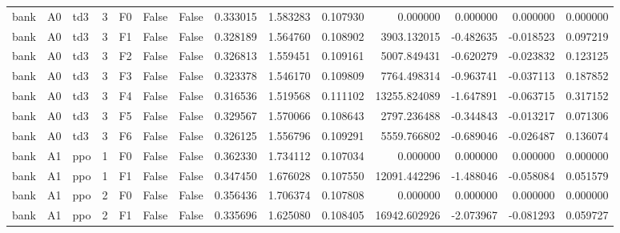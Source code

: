 \begin{tabular}{lllrlllrrrrrrr}
      bank &      A0 &       td3 &     3 &  F0 &           False &            False &  0.333015 &  1.583283 & 0.107930 &         0.000000 &           0.000000 &        0.000000 &            0.000000 \\
      bank &      A0 &       td3 &     3 &  F1 &           False &            False &  0.328189 &  1.564760 & 0.108902 &      3903.132015 &          -0.482635 &       -0.018523 &            0.097219 \\
      bank &      A0 &       td3 &     3 &  F2 &           False &            False &  0.326813 &  1.559451 & 0.109161 &      5007.849431 &          -0.620279 &       -0.023832 &            0.123125 \\
      bank &      A0 &       td3 &     3 &  F3 &           False &            False &  0.323378 &  1.546170 & 0.109809 &      7764.498314 &          -0.963741 &       -0.037113 &            0.187852 \\
      bank &      A0 &       td3 &     3 &  F4 &           False &            False &  0.316536 &  1.519568 & 0.111102 &     13255.824089 &          -1.647891 &       -0.063715 &            0.317152 \\
      bank &      A0 &       td3 &     3 &  F5 &           False &            False &  0.329567 &  1.570066 & 0.108643 &      2797.236488 &          -0.344843 &       -0.013217 &            0.071306 \\
      bank &      A0 &       td3 &     3 &  F6 &           False &            False &  0.326125 &  1.556796 & 0.109291 &      5559.766802 &          -0.689046 &       -0.026487 &            0.136074 \\
      bank &      A1 &       ppo &     1 &  F0 &           False &            False &  0.362330 &  1.734112 & 0.107034 &         0.000000 &           0.000000 &        0.000000 &            0.000000 \\
      bank &      A1 &       ppo &     1 &  F1 &           False &            False &  0.347450 &  1.676028 & 0.107550 &     12091.442296 &          -1.488046 &       -0.058084 &            0.051579 \\
      bank &      A1 &       ppo &     2 &  F0 &           False &            False &  0.356436 &  1.706374 & 0.107808 &         0.000000 &           0.000000 &        0.000000 &            0.000000 \\
      bank &      A1 &       ppo &     2 &  F1 &           False &            False &  0.335696 &  1.625080 & 0.108405 &     16942.602926 &          -2.073967 &       -0.081293 &            0.059727 \\

\end{tabular}

